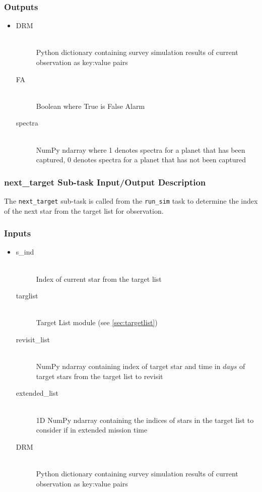 \documentclass[cleanfoot]{asme2ej}
\begin{document}
\subsubsection*{Outputs}
\begin{itemize}
    \item 
    \begin{description}
        \item[DRM] \hfill \\
        Python dictionary containing survey simulation results of current observation as key:value pairs
        \item[FA] \hfill \\
        Boolean where True is False Alarm
        \item[spectra] \hfill \\
        NumPy ndarray where 1 denotes spectra for a planet that has been captured, 0 denotes spectra for a planet that has not been captured
    \end{description}
\end{itemize}

\subsubsection{next\_target Sub-task Input/Output Description} \label{sec:nexttargettask}
The \verb+next_target+ sub-task is called from the \verb+run_sim+ task to determine the index of the next star from the target list for observation.

\subsubsection*{Inputs}
\begin{itemize}
    \item 
    \begin{description}
        \item[s\_ind] \hfill \\
        Index of current star from the target list
        \item[targlist] \hfill \\
        Target List module (see \ref{sec:targetlist})
        \item[revisit\_list] \hfill \\
        NumPy ndarray containing index of target star and time in $ days $ of target stars from the target list to revisit
        \item[extended\_list] \hfill \\
        1D NumPy ndarray containing the indices of stars in the target list to consider if in extended mission time
        \item[DRM] \hfill \\
        Python dictionary containing survey simulation results of current observation as key:value pairs
    \end{description}
\end{itemize}
\end{document}
